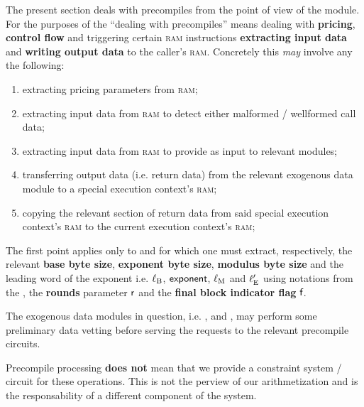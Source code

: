 The present section deals with precompiles from the point of view of the \hubMod{} module.
For the purposes of the \hubMod{} ``dealing with precompiles'' means dealing with \textbf{pricing}, \textbf{control flow} and triggering certain \textsc{ram} instructions \textbf{extracting input data} and \textbf{writing output data} to the caller's \textsc{ram}.
Concretely this \emph{may} involve any the following:
\begin{enumerate}
	\item extracting pricing parameters from \textsc{ram};
	\item extracting input data from \textsc{ram} to detect either malformed / wellformed call data;
	\item extracting input data from \textsc{ram} to provide as input to relevant modules;
	\item transferring output data (i.e. return data) from the relevant exogenous data module to a special execution context's \textsc{ram};
	\item copying the relevant section of return data from said special execution context's \textsc{ram} to the current execution context's \textsc{ram};
\end{enumerate}
\saNote{} The first point applies only to  and  for which one must extract, respectively,
the relevant \textbf{base byte size}, \textbf{exponent byte size}, \textbf{modulus byte size} and the leading word of the exponent i.e.
$\ell_\text{B}$, $\textsf{exponent}$, $\ell_\text{M}$ and $\ell_\text{E}'$ using notations from the \cite{EYP},
the \textbf{rounds} parameter $\textsf{r}$ and the \textbf{final block indicator flag} $\textsf{f}$.

\saNote{}
The exogenous data modules in question, i.e. \shakiraMod{}, \ecDataMod{} and \blkMdxMod{}, may perform some preliminary data vetting before serving the requests to the relevant precompile circuits.

\saNote{} Precompile processing \textbf{does not} mean that we provide a constraint system / circuit for these operations.
This is not the perview of our arithmetization and is the responsability of a different component of the system. 
